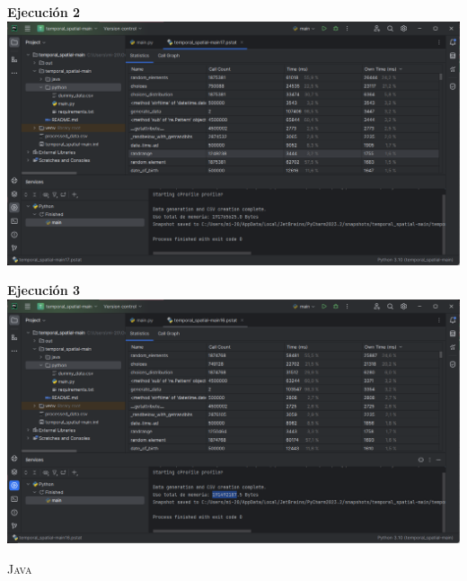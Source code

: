 \documentclass[a4paper,twocolumn,10pt]{article}
\begin{document}
\textbf{Ejecución 2\\}
\includegraphics[width=0.9\linewidth]{HP Ryzen 5500U/Prueba python 2.png}

\textbf{Ejecución 3\\}
\includegraphics[width=0.9\linewidth]{HP Ryzen 5500U/Prueba python 3.png} 

\textsc{Java}
\end{document}
